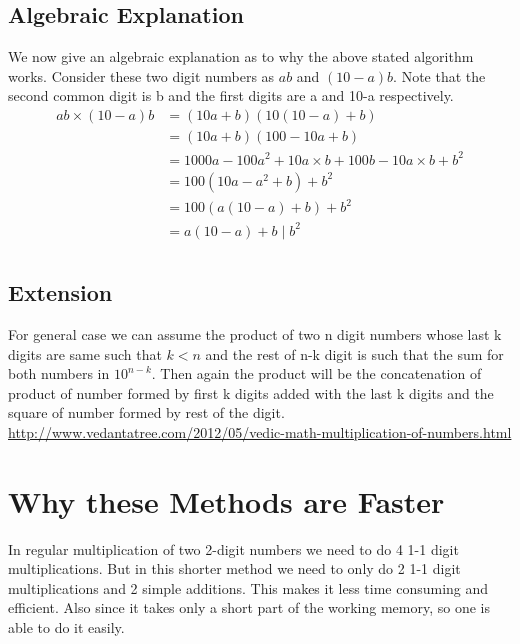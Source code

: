 \subsection{Algebraic Explanation}
We now give an algebraic explanation as to why the above stated algorithm works. Consider these two digit numbers as $ab$ and $(10-a)b$. Note that the second common digit is b and the first digits are a and 10-a respectively.
\begin{align*}
    ab  \times  (10-a)b & = ( 10a + b )( 10(10 - a) + b ) \\
                 & = ( 10a + b )( 100 - 10a + b ) \\
                 & = 1000a - 100a^2 + 10a \times b + 100b - 10a \times b + b^2 \\
                 & = 100(10a - a^2 + b) + b^2 \\
                 & = 100(a(10 - a) + b) + b^2 \\
                 & = a(10 - a) + b \; | \; b^2 \\   
\end{align*}
\subsection{Extension}
For general case we can assume the product of two n digit numbers whose last k digits are same such that $k < n$ and the rest of n-k digit is such that the sum for both numbers in $ {10}^{n-k} $. Then again the product will be the concatenation of product of number formed by first k digits added with the last k digits and the square of number formed by rest of the digit.
\url {http://www.vedantatree.com/2012/05/vedic-math-multiplication-of-numbers.html}

\section{Why these Methods are Faster}
In regular multiplication of two 2-digit numbers we need to do 4 1-1 digit multiplications. But in this shorter method we need to only do 2 1-1 digit multiplications and 2 simple additions. This makes it less time consuming and efficient. Also since it takes only a short part of the working memory, so one is able to do it easily.


 
